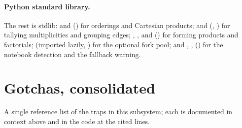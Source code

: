 \paragraph{Python standard library.} The rest is stdlib:
 and 
() for orderings and Cartesian products;
 and  (,
) for tallying multiplicities and grouping edges;
, , and 
() for forming products and factorials;
 (imported lazily, ) for the
optional fork pool; and , , 
() for the notebook detection and the fallback warning.

\section{Gotchas, consolidated}\label{sec:ta-gotchas}

A single reference list of the traps in this subsystem; each is documented in
context above and in the code at the cited lines.

